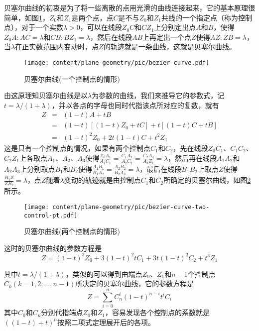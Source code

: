 \begin{example}
  贝塞尔曲线的初衷是为了将一些离散的点用光滑的曲线连接起来，它的基本原理很简单，如图\ref{fig:bezier-curve}，$Z_0$和$Z_1$是两个点，点$C$是不与$Z_0$和$Z_1$共线的一个指定点（称为控制点），对于一个实数$\lambda>0$，可以在线段$Z_0C$和$CZ_1$上分别定出点$A$和$B$，使得$Z_0A:AC = \lambda$和$CB:BZ_1=\lambda$，然后在线段$AB$上再定出一个点$Z$使得$AZ:ZB=\lambda$，当$\lambda$在正实数范围内变动时，点$Z$的轨迹就是一条曲线，这就是贝塞尔曲线。
 
\begin{figure}[htbp]
\centering
\texttt{[image: content/plane-geometry/pic/bezier-curve.pdf]}
\caption{贝塞尔曲线(一个控制点的情形)}
\label{fig:bezier-curve}
\end{figure}

由这原理知贝塞尔曲线是以$\lambda$为参数的曲线，我们来推导它的参数式，记$t = \lambda / (1+\lambda)$，并以各点的字母也同时代指该点所对应的复数，就有
\begin{eqnarray*}
  Z & = & (1-t) A + t B \\
    & = & (1-t)[(1-t)Z_0+tC] + t [(1-t)C+tB] \\
  & = & (1-t)^2 Z_0 + 2t(1-t)C +t^2 Z_1
\end{eqnarray*}
这是只有一个控制点的情况，如果有两个控制点$C_1$和$C_2$，先在线段$Z_0C_1$、$C_1C_2$、$C_2Z_1$上各取点$A_1$、$A_2$、$A_3$使得$\frac{Z_0A_1}{A_1C_1}=\frac{C_1A_2}{A_2C_2}=\frac{C_2A_3}{A_3Z_1}=\lambda$，然后再在线段$A_1A_2$和$A_2A_3$上分别取点$B_1$和$B_2$使得$\frac{A_1B_1}{B_1A_2}=\frac{A_2B_2}{B_2A_3}=\lambda$，最后在线段$B_1B_2$上取点$Z$使得$\frac{B_1Z}{ZB_2}=\lambda$，点$Z$随着$\lambda$变动的轨迹就是由控制点$C_1$和$C_2$所确定的贝塞尔曲线，如图\ref{fig:bezier-curve-two-control-pt}所示。

\begin{figure}[htbp]
\centering
\texttt{[image: content/plane-geometry/pic/bezier-curve-two-control-pt.pdf]}
\caption{贝塞尔曲线(两个控制点的情形)}
\label{fig:bezier-curve-two-control-pt}
\end{figure}

这时的贝塞尔曲线的参数方程是
\begin{equation*}
  Z = (1-t)^3Z_0 + 3(1-t)^2tC_1 + 3t(1-t)^2C_2 + t^3Z_1
\end{equation*}

其中$t=\lambda/(1+\lambda)$，类似的可以得到由端点$Z_0$、$Z_1$和$n-1$个控制点$C_k(k=1,2,\ldots,n-1)$所决定的贝塞尔曲线，它的参数方程是
\begin{equation*}
  Z = \sum_{i=0}^nC_n^i(1-t)^{n-i}t^iC_i 
\end{equation*}
其中$C_0$和$C_n$分别代指端点$Z_0$和$Z_1$，容易发现各个控制点的系数就是$((1-t)+t)^n$按照二项式定理展开后的各项。


\end{example}
